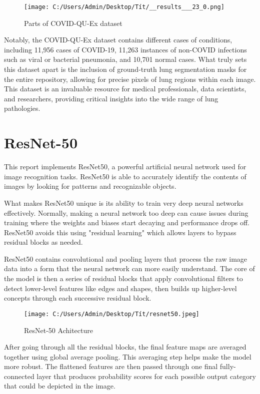 \documentclass{article}
\begin{document}
\begin{figure}[htbp]
    \centering
    \texttt{[image: C:/Users/Admin/Desktop/Tít/\_\_results\_\_\_23\_0.png]}
    \caption{Parts of COVID-QU-Ex dataset}
    \label{fig:visual}
\end{figure}

Notably, the COVID-QU-Ex dataset contains different cases of conditions, including 11,956 cases of COVID-19, 11,263 instances of non-COVID infections such as viral or bacterial pneumonia, and 10,701 normal cases. What truly sets this dataset apart is the inclusion of ground-truth lung segmentation masks for the entire repository, allowing for precise pixels of lung regions within each image. This dataset is an invaluable resource for medical professionals, data scientists, and researchers, providing critical insights into the wide range of lung pathologies. 
\newpage
\section{ResNet-50}
This report implements ResNet50, a powerful artificial neural network used for image recognition tasks. ResNet50 is able to accurately identify the contents of images by looking for patterns and recognizable objects.

What makes ResNet50 unique is its ability to train very deep neural networks effectively. Normally, making a neural network too deep can cause issues during training where the weights and biases start decaying and performance drops off. ResNet50 avoids this using "residual learning" which allows layers to bypass residual blocks as needed.

ResNet50 contains convolutional and pooling layers that process the raw image data into a form that the neural network can more easily understand. The core of the model is then a series of residual blocks that apply convolutional filters to detect lower-level features like edges and shapes, then builds up higher-level concepts through each successive residual block.

\begin{figure}[htbp]
    \centering
    \texttt{[image: C:/Users/Admin/Desktop/Tít/resnet50.jpeg]}
    \caption{ResNet-50 Achitecture}
    \label{fig:resnet50}
\end{figure}

After going through all the residual blocks, the final feature maps are averaged together using global average pooling. This averaging step helps make the model more robust. The flattened features are then passed through one final fully-connected layer that produces probability scores for each possible output category that could be depicted in the image.
\end{document}
